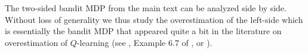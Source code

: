 \documentclass{article}
\newcommand{\E}{\mathbb{E}}
\theoremstyle{plain}
\theoremstyle{definition}
\theoremstyle{remark}
\begin{document}
The two-sided bandit MDP from the main text can be analyzed side by side. Without loss of generality we thus study the overestimation of the left-side which is essentially the bandit MDP that appeared quite a bit in the literature on overestimation of $Q$-learning (see  \cite{VanHasselt:2011}, Example 6.7 of \cite{Sutton1998}, or \cite{Maxmin}).



%
\end{document}
